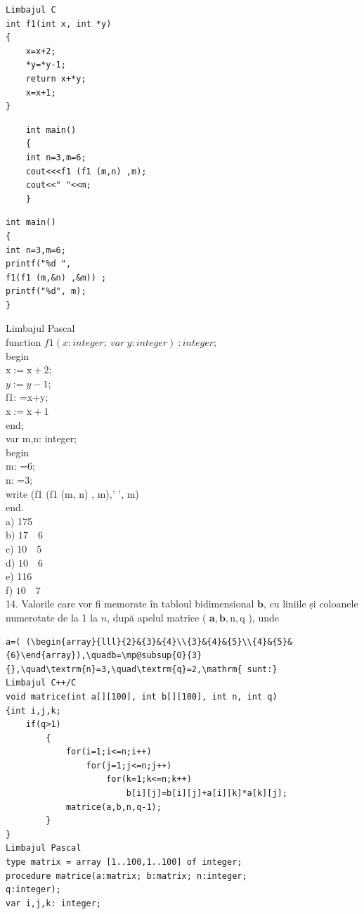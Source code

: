 \documentclass[10pt]{article}
\begin{document}
\begin{verbatim}
Limbajul C
int f1(int x, int *y)
{
    x=x+2;
    *y=*y-1;
    return x+*y;
    x=x+1;
}
\end{verbatim}

\begin{verbatim}
    int main()
    {
    int n=3,m=6;
    cout<<<f1 (f1 (m,n) ,m);
    cout<<" "<<m;
    }
\end{verbatim}

\begin{verbatim}
int main()
{
int n=3,m=6;
printf("%d ",
f1(f1 (m,&n) ,&m)) ;
printf("%d", m);
}
\end{verbatim}

Limbajul Pascal\\
function $f 1(x: i n t e g e r ; ~ v a r ~ y: i n t e g e r) ~: i n t e g e r ; ~$\\
begin\\
$\mathrm{x}:=\mathrm{x}+2$;\\
$y:=y-1$;\\
f1: =x+y;\\
$\mathrm{x}:=\mathrm{x}+1$\\
end;\\
var m,n: integer;\\
begin\\
m: =6;\\
n: =3;\\
write (f1 (f1 (m, n) , m),' ', m)\\
end.\\
a) 175\\
b) $17 \quad 6$\\
c) $10 \quad 5$\\
d) $10 \quad 6$\\
e) 116\\
f) $10 \quad 7$\\
14. Valorile care vor fi memorate în tabloul bidimensional $\mathbf{b}$, cu liniile și coloanele numerotate de la 1 la $n$, după apelul matrice ( $\mathbf{a}, \mathbf{b}, \mathrm{n}, \mathrm{q}$ ), unde

\begin{verbatim}
a=( (\begin{array}{lll}{2}&{3}&{4}\\{3}&{4}&{5}\\{4}&{5}&{6}\end{array}),\quadb=\mp@subsup{O}{3}{},\quad\textrm{n}=3,\quad\textrm{q}=2,\mathrm{ sunt:}
Limbajul C++/C
void matrice(int a[][100], int b[][100], int n, int q)
{int i,j,k;
    if(q>1)
        {
            for(i=1;i<=n;i++)
                for(j=1;j<=n;j++)
                    for(k=1;k<=n;k++)
                        b[i][j]=b[i][j]+a[i][k]*a[k][j];
            matrice(a,b,n,q-1);
        }
}
Limbajul Pascal
type matrix = array [1..100,1..100] of integer;
procedure matrice(a:matrix; b:matrix; n:integer;
q:integer);
var i,j,k: integer;
\end{verbatim}
\end{document}
